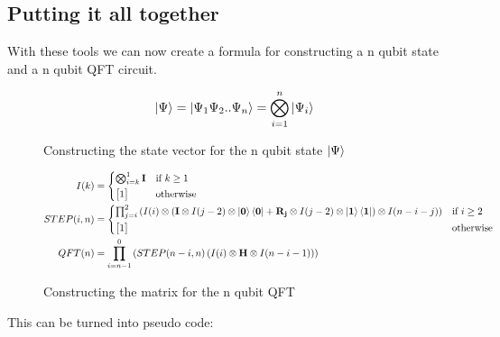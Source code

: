 \subsection{Putting it all together}
With these tools we can now create a formula for constructing a n qubit state and a n qubit QFT circuit. 
\begin{figure}[H]
    \begin{align*}
        \ket{\Psi} = \ket{\Psi_1\Psi_2..\Psi_n} = \bigotimes_{i=1}^n \ket{\Psi_i}
    \end{align*}
    \caption{Constructing the state vector for the n qubit state $\ket{\Psi}$}
    \label{fig:CPsi}
\end{figure}
\begin{figure}[H]
    \begin{align*}
        I(k) &= 
            \begin{cases*}
                \bigotimes_{i=k}^1\qti
                & if $k\geq 1$ \\
            \begin{bmatrix}1\end{bmatrix}        & otherwise
            \end{cases*}\\
        STEP(i,n) &= 
            \begin{cases*}
            \prod_{j=i}^2  
                \left(
                I(i)
                \otimes
                \left(
                \qti\otimes I(j-2)\otimes\ket{\qtz}\bra{\qtz}
                + 
                \qtr{j}\otimes I(j-2)\otimes\ket{\qto}\bra{\qto}
                \right)
                \otimes
                I(n-i-j)
                \right)& if $i\geq2$ \\
            \begin{bmatrix}1\end{bmatrix}        & otherwise
            \end{cases*}\\
        QFT(n) &= 
        \prod_{i=n-1}^0
            \left(
            STEP(n-i,n)
            \left(
            I(i)\otimes
            \qth\otimes
            I(n-i-1)
            \right)
            \right)
    \end{align*}
    \caption{Constructing the matrix for the n qubit QFT}
    \label{fig:CQFT}
\end{figure}
\noindent
This can be turned into pseudo code: 


